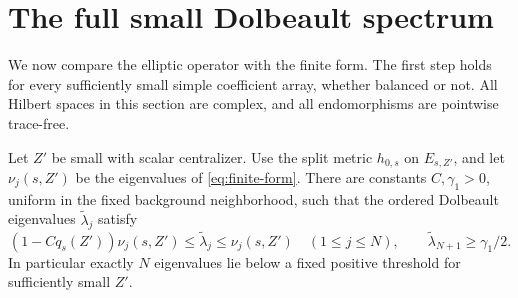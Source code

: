 \section{The full small Dolbeault spectrum}\label{sec:spectrum}

We now compare the elliptic operator with the finite form. The first
step holds for every sufficiently small simple coefficient array,
whether balanced or not. All Hilbert spaces in this section are
complex, and all endomorphisms are pointwise trace-free.

\begin{proposition}\label{prop:schur}
Let $Z'$ be small with scalar centralizer. Use the split metric
$h_{0,s}$ on $E_{s,Z'}$, and let $\nu_j(s,Z')$ be the eigenvalues
of \eqref{eq:finite-form}. There are constants $C,\gamma_1>0$,
uniform in the fixed background neighborhood, such that the
ordered Dolbeault eigenvalues $\widetilde\lambda_j$ satisfy
\begin{equation}\label{eq:schurbound}
(1-Cq_s(Z'))\nu_j(s,Z')\le\widetilde\lambda_j
\le\nu_j(s,Z')\quad(1\le j\le N),\qquad
\widetilde\lambda_{N+1}\ge\gamma_1/2.
\end{equation}
In particular exactly $N$ eigenvalues lie below a fixed positive
threshold for sufficiently small $Z'$.
\end{proposition}

